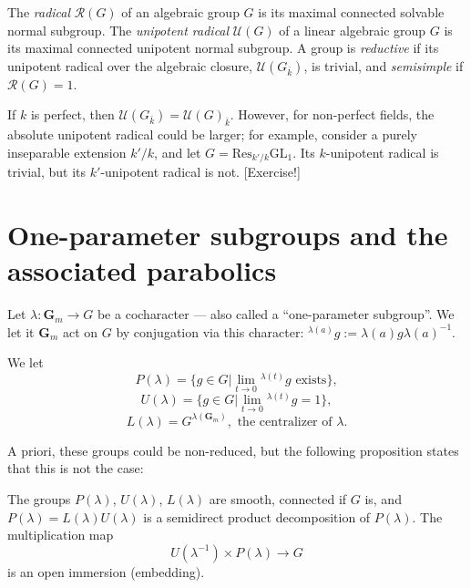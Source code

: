 \begin{definition}
\label{definition-reductive}
The {\it radical} $\mathcal R(G)$ of an algebraic group $G$ is its maximal connected solvable normal subgroup. The {\it unipotent radical} $\mathcal U(G)$ of a linear algebraic group $G$ is its maximal connected unipotent normal subgroup. A group is {\it reductive} if its unipotent radical over the algebraic closure, $\mathcal U(G_{\bar k})$, is trivial, and {\it semisimple} if $\mathcal R(G)=1$.
\end{definition}

\begin{remark}
 \label{remark-unipotent-radical}
If $k$ is perfect, then $\mathcal U(G_{\bar k}) = \mathcal U(G)_{\bar k}$. However, for non-perfect fields, the absolute unipotent radical could be larger; for example, consider a purely inseparable extension $k'/k$, and let $G = \text{Res}_{k'/k}\text{GL}_1$. Its $k$-unipotent radical is trivial, but its $k'$-unipotent radical is not. [Exercise!]
\end{remark}



\section{One-parameter subgroups and the associated parabolics}
\label{section-one-parameter}

Let $\lambda:\mathbf{G}_m \to G$ be a cocharacter --- also called a ``one-parameter subgroup''. We let it $\mathbf G_m$ act on $G$ by conjugation via this character: $^{\lambda(a)}g:= \lambda(a) g \lambda(a)^{-1}$.

We let 
$$P(\lambda)=\{g\in G| \lim_{t\to 0} {^{\lambda(t)}g} \mbox{ exists}\},$$  
$$U(\lambda)=\{g\in G| \lim_{t\to 0} {^{\lambda(t)}g} =1\},$$
$$L(\lambda)= G^{\lambda(\mathbf G_m)},\mbox{ the centralizer of }\lambda.$$

A priori, these groups could be non-reduced, but the following proposition states that this is not the case:

\begin{proposition}
 \label{proposition-cocharacters-parabolics}
The groups $P(\lambda)$, $U(\lambda)$, $L(\lambda)$ are smooth, connected if $G$ is, and $P(\lambda)=L(\lambda)U(\lambda)$ is a semidirect product decomposition of $P(\lambda)$. The multiplication map 
$$ U(\lambda^{-1})\times P(\lambda)\to G$$
is an open immersion (embedding).
\end{proposition}

